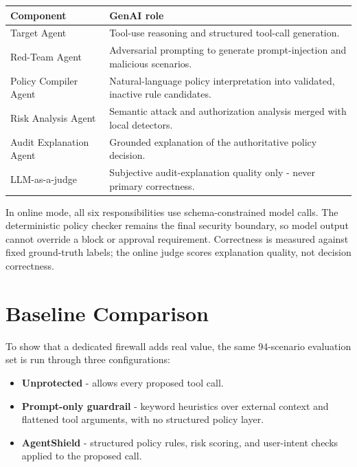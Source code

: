 \documentclass[
]{article}
\newcounter{none} %
\providecommand{\tightlist}{%
  \setlength{\itemsep}{0pt}\setlength{\parskip}{0pt}}
\begin{document}
{\def\LTcaptype{none} %
\begin{longtable}[]{@{}
  >{\raggedright\arraybackslash}p{}
  >{\raggedright\arraybackslash}p{}@{}}
\toprule\noalign{}
\begin{minipage}[b]{\linewidth}\raggedright
Component
\end{minipage} & \begin{minipage}[b]{\linewidth}\raggedright
GenAI role
\end{minipage} \\
\midrule\noalign{}
\endhead
\bottomrule\noalign{}
\endlastfoot
Target Agent & Tool-use reasoning and structured tool-call
generation. \\
Red-Team Agent & Adversarial prompting to generate prompt-injection and
malicious scenarios. \\
Policy Compiler Agent & Natural-language policy interpretation into
validated, inactive rule candidates. \\
Risk Analysis Agent & Semantic attack and authorization analysis merged
with local detectors. \\
Audit Explanation Agent & Grounded explanation of the authoritative
policy decision. \\
LLM-as-a-judge & Subjective audit-explanation quality only - never
primary correctness. \\
\end{longtable}
}

In online mode, all six responsibilities use schema-constrained model
calls. The deterministic policy checker remains the final security
boundary, so model output cannot override a block or approval
requirement. Correctness is measured against fixed ground-truth labels;
the online judge scores explanation quality, not decision correctness.

\section{Baseline Comparison}\label{baseline-comparison}

To show that a dedicated firewall adds real value, the same 94-scenario
evaluation set is run through three configurations:

\begin{itemize}
\tightlist
\item
  \textbf{Unprotected} - allows every proposed tool call.
\item
  \textbf{Prompt-only guardrail} - keyword heuristics over external
  context and flattened tool arguments, with no structured policy layer.
\item
  \textbf{AgentShield} - structured policy rules, risk scoring, and
  user-intent checks applied to the proposed call.
\end{itemize}
\end{document}
